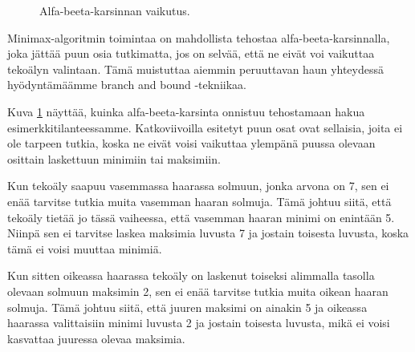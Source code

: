 \begin{figure}
\center
{}
\caption{Alfa-beeta-karsinnan vaikutus.}
\label{fig:alfbet}
\end{figure}

Minimax-algoritmin toimintaa on mahdollista tehostaa
alfa-beeta-karsinnalla, joka jättää puun osia tutkimatta,
jos on selvää, että ne eivät voi vaikuttaa tekoälyn valintaan.
Tämä muistuttaa aiemmin peruuttavan haun yhteydessä
hyödyntämäämme branch and bound -tekniikaa.

Kuva \ref{fig:alfbet} näyttää, kuinka alfa-beeta-karsinta
onnistuu tehostamaan hakua esimerkkitilanteessamme.
Katkoviivoilla esitetyt puun osat ovat sellaisia,
joita ei ole tarpeen tutkia, koska ne eivät voisi vaikuttaa
ylempänä puussa olevaan osittain laskettuun minimiin tai maksimiin.

Kun tekoäly saapuu vasemmassa haarassa solmuun,
jonka arvona on 7, sen ei enää tarvitse tutkia muita
vasemman haaran solmuja. Tämä johtuu siitä, että tekoäly
tietää jo tässä vaiheessa, että vasemman haaran minimi
on enintään 5. Niinpä sen ei tarvitse laskea maksimia luvusta
7 ja jostain toisesta luvusta, koska tämä ei voisi muuttaa minimiä.

Kun sitten oikeassa haarassa tekoäly on laskenut
toiseksi alimmalla tasolla olevaan solmuun
maksimin 2, sen ei enää tarvitse tutkia muita oikean haaran solmuja.
Tämä johtuu siitä, että juuren maksimi on ainakin 5 ja
oikeassa haarassa valittaisiin minimi luvusta 2 ja jostain toisesta luvusta,
mikä ei voisi kasvattaa juuressa olevaa maksimia.
